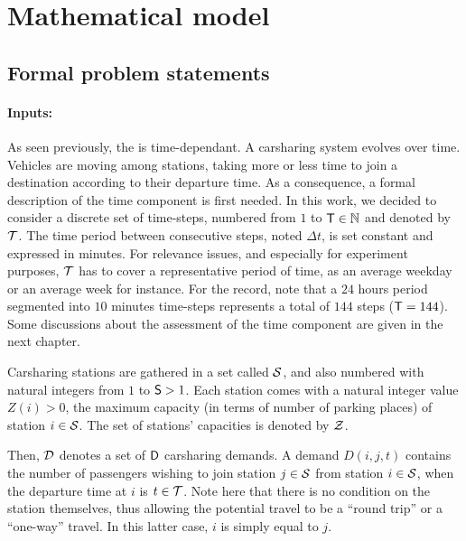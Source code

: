 \section{Mathematical model} \label{sec:sdp:mathModel}
\subsection{Formal problem statements}
\paragraph{Inputs:}

As seen previously, the {\SDP} is time-dependant.
A carsharing system evolves over time.
Vehicles are moving among stations, taking more or less time to join a destination according to their departure time.
As a consequence, a formal description of the time component is first needed.
In this work, we decided to consider a discrete set of time-steps, numbered from $1$ to $\mathsf{T} \in \mathbb{N}$ and denoted by $\mathcal{T}$.
The time period between consecutive steps, noted $\Delta t$, is set constant and expressed in minutes.
For relevance issues, and especially for experiment purposes, $\mathcal{T}$ has to cover a representative period of time, as an average weekday or an average week for instance.
For the record, note that a $24$ hours period segmented into $10$ minutes time-steps represents a total of $144$ steps (\ie $\mathsf{T} = 144$).
Some discussions about the assessment of the time component are given in the next chapter.


\medskip
Carsharing stations are gathered in a set called $\mathcal{S}$, and also numbered with natural integers from $1$ to $\mathsf{S} > 1$.
Each station comes with a natural integer value $Z(i) > 0$, the maximum capacity (in terms of number of parking places) of station $i \in \mathcal{S}$.
The set of stations' capacities is denoted by $\mathcal{Z}$.
\medskip

Then, $\mathcal{D}$ denotes a set of $\mathsf{D}$ carsharing demands.
A demand $D(i,j,t)$ contains the number of passengers wishing to join station $j \in \mathcal{S}$ from station $i \in \mathcal{S}$, when the departure time at $i$ is $t \in \mathcal{T}$.
Note here that there is no condition on the station themselves, thus allowing the potential travel to be a ``round trip'' or a ``one-way'' travel.
In this latter case, $i$ is simply equal to $j$.
\medskip

